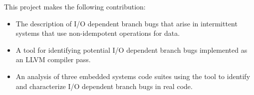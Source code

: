 This project makes the following contribution:
\begin{itemize}[topsep=0pt,leftmargin=.1in]
\setlength\itemsep{-4pt}
  \item{The description of I/O dependent branch bugs that arise in intermittent
systems that use non-idempotent operations for data.}
  \item{A tool for identifying potential I/O dependent branch bugs implemented
as an LLVM compiler pass.}
  \item{An analysis of three embedded systems code suites using the tool to identify
and characterize I/O dependent branch bugs in real code.}
\end{itemize}



